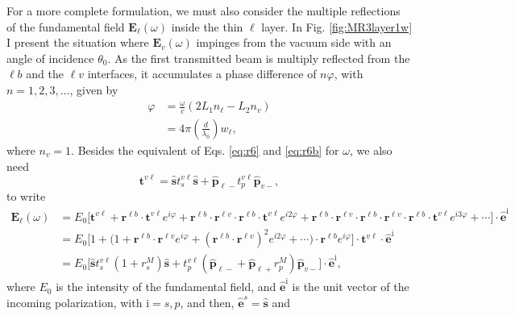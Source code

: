 For a more complete formulation, we must also consider the multiple reflections
of the fundamental field $\mathbf{E}_{\ell}(\omega)$ inside the thin $\ell$
layer. In Fig. \ref{fig:MR3layer1w} I present the situation where
$\mathbf{E}_{v}(\omega)$ impinges from the vacuum side with an angle of
incidence $\theta_{0}$. As the first transmitted beam is multiply reflected from
the $\ell b$ and the $\ell v$ interfaces, it accumulates a phase difference of
$n\varphi$, with $n=1,2,3,\ldots$, given by
\begin{equation}\label{mphi}
\begin{split}
\varphi &= \frac{\omega}{c}(2L_{1}n_{\ell} - L_{2}n_{v})\\
&= 4\pi\left(\frac{d}{\lambda_{0}}\right)w_{\ell},
\end{split}
\end{equation}
where $n_{v}=1$. Besides the equivalent of Eqs. \eqref{eq:r6} and \eqref{eq:r6b}
for $\omega$, we also need
\begin{equation}\label{eq:mvv}
\mathbf{t}^{v\ell}
= \hat{\mathbf{s}}t_{s}^{v\ell}\hat{\mathbf{s}} 
+ \hat{\mathbf{p}}_{\ell -}t_{p}^{v\ell}\hat{\mathbf{p}}_{v-},
\end{equation}
to write
\begin{align}\label{eq:mcvew}
\mathbf{E}_{\ell}(\omega)
&= E_{0}
\Big[
\mathbf{t}^{v\ell} + \mathbf{r}^{\ell b}\cdot\mathbf{t}^{v\ell}e^{i\varphi}
 + \mathbf{r}^{\ell b}\cdot\mathbf{r}^{\ell v}\cdot
   \mathbf{r}^{\ell b}\cdot\mathbf{t}^{v\ell} e^{i2\varphi}
 + \mathbf{r}^{\ell b}\cdot\mathbf{r}^{\ell v}\cdot
   \mathbf{r}^{\ell b}\cdot\mathbf{r}^{\ell v}\cdot
   \mathbf{r}^{\ell b}\cdot\mathbf{t}^{v\ell} e^{i3\varphi}
 + \cdots
\Big]\cdot\hat{\mathbf{e}}^{\mathrm{i}}\nonumber\\
&= E_{0}
\Big[
1 + \Big(1 + \mathbf{r}^{\ell b}\cdot\mathbf{r}^{\ell v}e^{i\varphi}
+ (\mathbf{r}^{\ell b}\cdot\mathbf{r}^{\ell v})^2e^{i2\varphi}+\cdots\Big)\cdot
\mathbf{r}^{\ell b}e^{i\varphi}
\Big]
\cdot\mathbf{t}^{v\ell}\cdot\hat{\mathbf{e}}^{\mathrm{i}}\nonumber\\
&= E_{0}
\Big[
\hat{\mathbf{s}} t^{v\ell}_{s}(1+r^{M}_{s})\hat{\mathbf{s}} 
+ t^{v\ell}_{p}
\left(\hat{\mathbf{p}}_{\ell-}+\hat{\mathbf{p}}_{\ell+}r^{M}_{p}\right)
\hat{\mathbf{p}}_{v-}
\Big]\cdot\hat{\mathbf{e}}^{\mathrm{i}},
\end{align}
where $E_{0}$ is the intensity of the fundamental field, and
$\hat{\mathbf{e}}^{\mathrm{i}}$ is the unit vector of the incoming polarization,
with $\mathrm{i} = s,p$, and then, $\hat{\mathbf{e}}^{s}=\hat{\mathbf{s}}$ and
